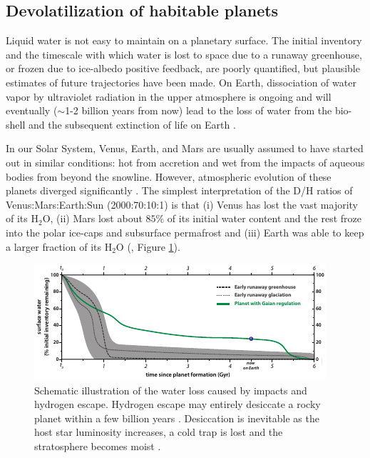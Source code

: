 \subsection{Devolatilization of habitable planets}
\label{sec:awayfromhabitability}

Liquid water is not easy to maintain on a planetary surface. The initial inventory and the timescale with which water is lost to space due to a runaway greenhouse, or frozen due to ice-albedo positive feedback, are poorly quantified, but plausible estimates of future trajectories have been made. On Earth, dissociation of water vapor by ultraviolet radiation in the upper atmosphere
is ongoing and will eventually ($\sim$1-2 billion years from now) lead to the loss of water from the bio-shell and the subsequent extinction of life on Earth \citep{Caldeira1992,Franck2000,Lenton2001,Franck2002,vonBloh2005}.


In our Solar System, Venus, Earth, and Mars are usually assumed to have started out in similar conditions: hot from accretion and wet from the impacts of aqueous bodies from beyond the snowline. However, atmospheric evolution of these planets diverged significantly \citep{Kasting1988,Kulikov2007,Driscoll2013}. The simplest interpretation of the D/H ratios of Venus:Mars:Earth:Sun (2000:70:10:1) is that (i) Venus has lost the vast majority of its H$_{2}$O, (ii) Mars lost about $85\%$ of its initial water content and the rest froze into the polar ice-caps and subsurface permafrost \citep{Kurokawa2014,Villanueva2015a} and (iii) Earth was able to keep a larger fraction of its H$_{2}$O (\citet{Pope2012}, Figure \ref{fig:inventory}).

\begin{figure}[!htbp]
	\centering
	\includegraphics[width=1.0\linewidth]{figures/WaterInventory.pdf}
	\caption[Water loss on initially `wet' rocky planets]{
		Schematic illustration of the water loss caused by impacts and hydrogen escape.
		Hydrogen escape may entirely desiccate a rocky planet within a few billion years \citep{Lovelock2005}. Desiccation is inevitable as the host star luminosity increases, a cold trap is lost and the stratosphere becomes moist \citep{Lenton2001,OMalley-James2015}.}
	\label{fig:inventory}
\end{figure}

